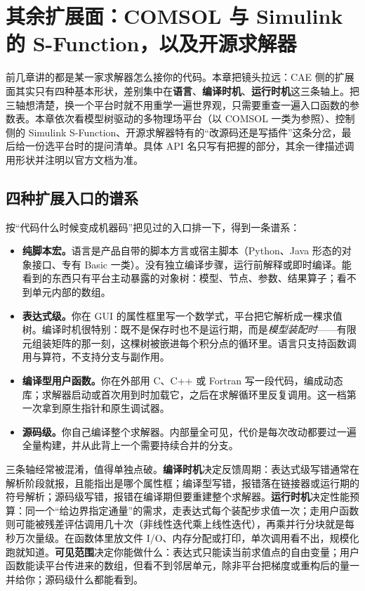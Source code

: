 \documentclass[12pt,a4paper,fontset=fandol]{ctexbook}
\newcommand{\Lang}[1]{\textsf{#1}}
\newcommand{\CL}{\Lang{C}}
\newcommand{\CPP}{\Lang{C++}}
\newcommand{\PY}{\Lang{Python}}
\newcommand{\DomCAE}{\Lang{CAE}}
\begin{document}
\chapter{其余扩展面：COMSOL 与 Simulink 的 S-Function，以及开源求解器}
\label{ch:ch07-other-extensions}

前几章讲的都是某一家求解器怎么接你的代码。本章把镜头拉远：\DomCAE{} 侧的扩展面其实只有四种基本形状，差别集中在\textbf{语言}、\textbf{编译时机}、\textbf{运行时机}这三条轴上。把三轴想清楚，换一个平台时就不用重学一遍世界观，只需要重查一遍入口函数的参数表。本章依次看模型树驱动的多物理场平台（以 COMSOL 一类为参照）、控制侧的 Simulink S-Function、开源求解器特有的``改源码还是写插件''这条分岔，最后给一份选平台时的提问清单。具体 API 名只写有把握的部分，其余一律描述调用形状并注明以官方文档为准。

\section{四种扩展入口的谱系}
\label{sec:ch07-entry-lineage}

按``代码什么时候变成机器码''把见过的入口排一下，得到一条谱系：

\begin{itemize}
\item \textbf{纯脚本宏。}语言是产品自带的脚本方言或宿主脚本（\PY、Java 形态的对象接口、专有 Basic 一类）。没有独立编译步骤，运行前解释或即时编译。能看到的东西只有平台主动暴露的对象树：模型、节点、参数、结果算子；看不到单元内部的数组。
\item \textbf{表达式级。}你在 GUI 的属性框里写一个数学式，平台把它解析成一棵求值树。编译时机很特别：既不是保存时也不是运行期，而是\emph{模型装配时}——有限元组装矩阵的那一刻，这棵树被嵌进每个积分点的循环里。语言只支持函数调用与算符，不支持分支与副作用。
\item \textbf{编译型用户函数。}你在外部用 \CL{}、\CPP{} 或 Fortran 写一段代码，编成动态库；求解器启动或首次用到时加载它，之后在求解循环里反复调用。这一档第一次拿到原生指针和原生调试器。
\item \textbf{源码级。}你自己编译整个求解器。内部量全可见，代价是每次改动都要过一遍全量构建，并从此背上一个需要持续合并的分支。
\end{itemize}

三条轴经常被混淆，值得单独点破。\textbf{编译时机}决定反馈周期：表达式级写错通常在解析阶段就报，且能指出是哪个属性框；编译型写错，报错落在链接器或运行期的符号解析；源码级写错，报错在编译期但要重建整个求解器。\textbf{运行时机}决定性能预算：同一个``给边界指定通量''的需求，走表达式每个装配步求值一次；走用户函数则可能被残差评估调用几十次（非线性迭代乘上线性迭代），再乘并行分块就是每秒万次量级。在函数体里放文件 I/O、内存分配或打印，单次调用看不出，规模化跑就知道。\textbf{可见范围}决定你能做什么：表达式只能读当前求值点的自由变量；用户函数能读平台传进来的数组，但看不到邻居单元，除非平台把梯度或重构后的量一并给你；源码级什么都能看到。
\end{document}
